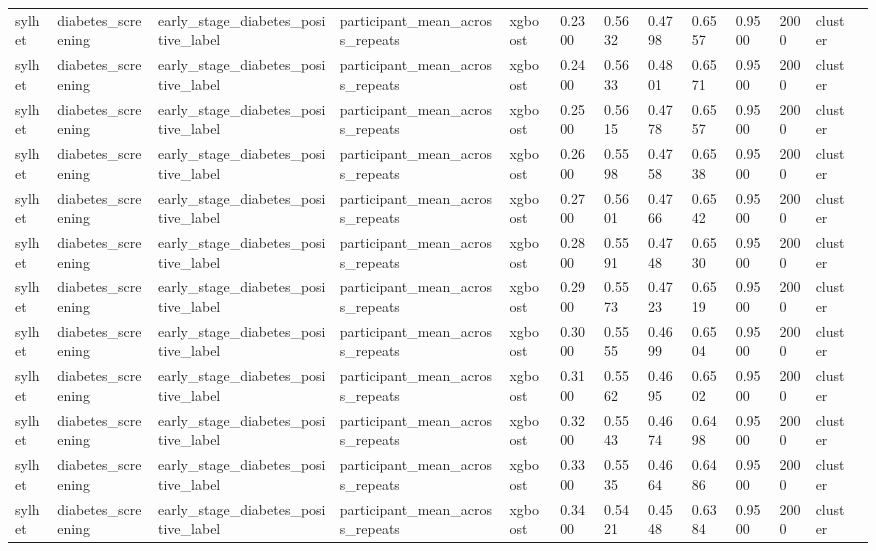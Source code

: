 \begin{tabular}{lllllllllllll}
sylhet & diabetes\_screening & early\_stage\_diabetes\_positive\_label & participant\_mean\_across\_repeats & xgboost & 0.2300 & 0.5632 & 0.4798 & 0.6557 & 0.9500 & 2000 & cluster &  \\
sylhet & diabetes\_screening & early\_stage\_diabetes\_positive\_label & participant\_mean\_across\_repeats & xgboost & 0.2400 & 0.5633 & 0.4801 & 0.6571 & 0.9500 & 2000 & cluster &  \\
sylhet & diabetes\_screening & early\_stage\_diabetes\_positive\_label & participant\_mean\_across\_repeats & xgboost & 0.2500 & 0.5615 & 0.4778 & 0.6557 & 0.9500 & 2000 & cluster &  \\
sylhet & diabetes\_screening & early\_stage\_diabetes\_positive\_label & participant\_mean\_across\_repeats & xgboost & 0.2600 & 0.5598 & 0.4758 & 0.6538 & 0.9500 & 2000 & cluster &  \\
sylhet & diabetes\_screening & early\_stage\_diabetes\_positive\_label & participant\_mean\_across\_repeats & xgboost & 0.2700 & 0.5601 & 0.4766 & 0.6542 & 0.9500 & 2000 & cluster &  \\
sylhet & diabetes\_screening & early\_stage\_diabetes\_positive\_label & participant\_mean\_across\_repeats & xgboost & 0.2800 & 0.5591 & 0.4748 & 0.6530 & 0.9500 & 2000 & cluster &  \\
sylhet & diabetes\_screening & early\_stage\_diabetes\_positive\_label & participant\_mean\_across\_repeats & xgboost & 0.2900 & 0.5573 & 0.4723 & 0.6519 & 0.9500 & 2000 & cluster &  \\
sylhet & diabetes\_screening & early\_stage\_diabetes\_positive\_label & participant\_mean\_across\_repeats & xgboost & 0.3000 & 0.5555 & 0.4699 & 0.6504 & 0.9500 & 2000 & cluster &  \\
sylhet & diabetes\_screening & early\_stage\_diabetes\_positive\_label & participant\_mean\_across\_repeats & xgboost & 0.3100 & 0.5562 & 0.4695 & 0.6502 & 0.9500 & 2000 & cluster &  \\
sylhet & diabetes\_screening & early\_stage\_diabetes\_positive\_label & participant\_mean\_across\_repeats & xgboost & 0.3200 & 0.5543 & 0.4674 & 0.6498 & 0.9500 & 2000 & cluster &  \\
sylhet & diabetes\_screening & early\_stage\_diabetes\_positive\_label & participant\_mean\_across\_repeats & xgboost & 0.3300 & 0.5535 & 0.4664 & 0.6486 & 0.9500 & 2000 & cluster &  \\
sylhet & diabetes\_screening & early\_stage\_diabetes\_positive\_label & participant\_mean\_across\_repeats & xgboost & 0.3400 & 0.5421 & 0.4548 & 0.6384 & 0.9500 & 2000 & cluster &  \\

\end{tabular}
